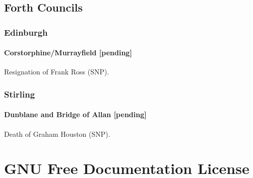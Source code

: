 \documentclass[a4paper,openany]{book}
\begin{document}
\begin{resultsiii}
\section{Forth Councils}

\subsection*{Edinburgh}

\subsubsection*{Corstorphine\slash Murrayfield \hspace*{\fill}\nolinebreak[1]%
	\enspace\hspace*{\fill}
	[pending]}


Resignation of Frank Ross (SNP).

\subsection*{Stirling}

\subsubsection*{Dunblane and Bridge of Allan \hspace*{\fill}\nolinebreak[1]%
	\enspace\hspace*{\fill}
	[pending]}


Death of Graham Houston (SNP).

\end{resultsiii}

\clearpage
{}
{\scriptsize%
\frenchspacing\printindex}
\thispagestyle{plain}

\chapter*{{GNU Free Documentation License}}
\pagestyle{plain}
\end{document}
